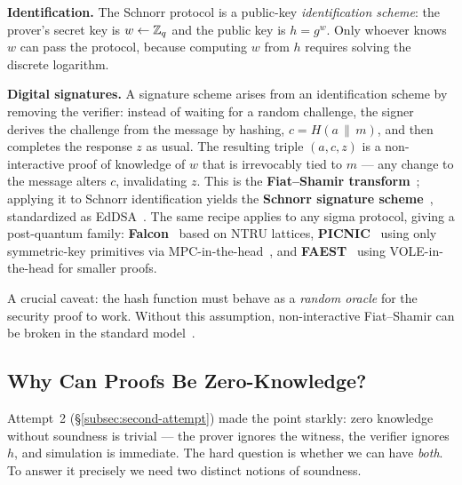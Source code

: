 \begin{tcolorbox}[colback=green!4!white,colframe=green!50!black,boxrule=0.6pt,
  title=\textbf{Further reading: from identification to signatures and beyond}]
\small

\textbf{Identification.}
The Schnorr protocol is a public-key \emph{identification scheme}: the prover's secret key is $w \leftarrow \mathbb{Z}_q$ and the public key is $h = g^w$.
Only whoever knows $w$ can pass the protocol, because computing $w$ from $h$ requires solving the discrete logarithm.

\medskip
\textbf{Digital signatures.}
A signature scheme arises from an identification scheme by removing the verifier: instead of waiting for a random challenge, the signer derives the challenge from the message by hashing, $c = H(a \,\|\, m)$, and then completes the response $z$ as usual.
The resulting triple $(a, c, z)$ is a non-interactive proof of knowledge of $w$ that is irrevocably tied to $m$ --- any change to the message alters $c$, invalidating $z$.
This is the \textbf{Fiat--Shamir transform}~\cite{FiatShamir1986}; applying it to Schnorr identification yields the \textbf{Schnorr signature scheme}~\cite{Schnorr89}, standardized as EdDSA~\cite{BDLSY11}.
The same recipe applies to any sigma protocol, giving a post-quantum family: \textbf{Falcon}~\cite{Falcon20} based on NTRU lattices, \textbf{PICNIC}~\cite{PICNIC17} using only symmetric-key primitives via MPC-in-the-head~\cite{IKOS07}, and \textbf{FAEST}~\cite{FAEST23} using VOLE-in-the-head for smaller proofs.

\smallskip
A crucial caveat: the hash function must behave as a \emph{random oracle} for the security proof to work.
Without this assumption, non-interactive Fiat--Shamir can be broken in the standard model~\cite{GoldwasserKalai03}.
\end{tcolorbox}

\subsection{Why Can Proofs Be Zero-Knowledge?}

Attempt~2 (\S\ref{subsec:second-attempt}) made the point starkly: zero knowledge without soundness is trivial --- the prover ignores the witness, the verifier ignores $h$, and simulation is immediate. The hard question is whether we can have \emph{both}. To answer it precisely we need two distinct notions of soundness.

